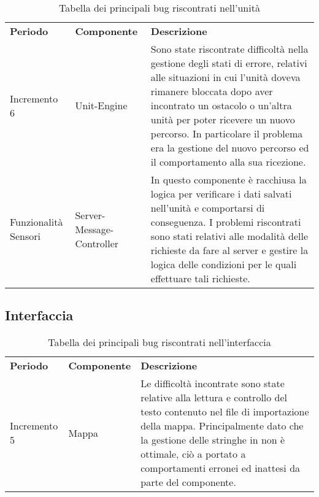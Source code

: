 \begin{table} [!ht]
	\begin{center}
		\begin{tabular} { m{2.5cm} m{2.5cm} m{11cm}  }
			\rowcolor{lightgray}
			\textbf{Periodo} & \textbf{Componente} & \textbf{Descrizione}\\

			Incremento 6 & Unit-Engine & Sono state riscontrate difficoltà nella gestione degli stati di errore, relativi alle situazioni in cui l'unità doveva rimanere bloccata dopo aver incontrato un ostacolo o un'altra unità per poter ricevere un nuovo percorso. In particolare il problema era la gestione del nuovo percorso ed il comportamento alla sua ricezione. \\

			Funzionalità Sensori & Server-Message-Controller & In questo componente è racchiusa la logica per verificare i dati salvati nell'unità e comportarsi di conseguenza. I problemi riscontrati sono stati relativi alle modalità delle richieste da fare al server e gestire la logica delle condizioni per le quali effettuare tali richieste. \\

		\end{tabular}
	\end{center}
	\caption{Tabella dei principali bug riscontrati nell'unità}
\end{table}

\subsection{Interfaccia}

\begin{table} [!ht]
	\begin{center}
		\begin{tabular} { m{2.5cm} m{2.5cm} m{11cm}  }
			\rowcolor{lightgray}
			\textbf{Periodo} & \textbf{Componente} & \textbf{Descrizione}\\

			Incremento 5 & Mappa & Le difficoltà incontrate sono state relative alla lettura e controllo del testo contenuto nel file di importazione della mappa. Principalmente dato che la gestione delle stringhe in \glock{Javascript} non è ottimale, ciò a portato a comportamenti erronei ed inattesi da parte del componente. \\

		\end{tabular}
	\end{center}
	\caption{Tabella dei principali bug riscontrati nell'interfaccia}
\end{table}